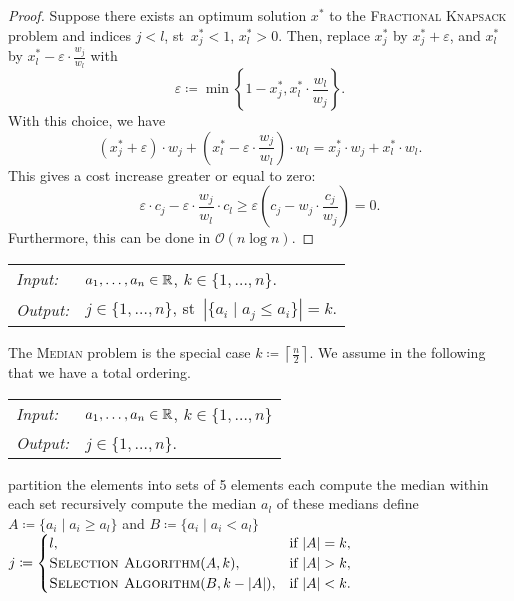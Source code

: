 \documentclass[../skript.tex]{subfiles}
\begin{document}
\begin{proof}
Suppose there exists an optimum solution $x^*$ to the \textsc{Fractional Knapsack} problem and indices $j < l$, \ac{st}\ $x_j^* < 1$, $x_l^* > 0$.
Then, replace $x_j^*$ by $x_j^* + \varepsilon$, and $x_l^*$ by $x_l^* - \varepsilon \cdot \frac{w_j}{w_l}$ with
\[
	\varepsilon \coloneqq \min \left\{ 1-x_j^*, x_l^* \cdot \frac{w_l}{w_j} \right\}.
\]
With this choice, we have
\[
	(x_j^* + \varepsilon) \cdot w_j + \left(x_l^* - \varepsilon \cdot \frac{w_j}{w_l}\right) \cdot w_l = x_j^* \cdot w_j + x_l^* \cdot w_l.
\]
This gives a cost increase greater or equal to zero:
\[
	\varepsilon \cdot c_j - \varepsilon \cdot \frac{w_j}{w_l} \cdot c_l \geq \varepsilon \left( c_j - w_j \cdot \frac{c_j}{w_j} \right) = 0.
\]
Furthermore, this can be done in $\mathcal{O}(n \log n)$.
\end{proof}
\begin{problem}[Selection]
\begin{tabular}{@{}ll}
\textit{Input:} & $a_1, \ldots, a_n \in \mathbb{R}$, $k \in \{ 1, \ldots, n \}$. \\
\textit{Output:} & $j \in \{ 1, \ldots, n \}$, \ac{st}\ $|\{ a_i \mid a_j \leq a_i \}| = k$.
\end{tabular}
\end{problem}
The \textsc{Median} problem is the special case $k \coloneqq \left\lceil \frac{n}{2} \right\rceil$.
We assume in the following that we have a total ordering.
\pagebreak
\begin{algorithmbox}
\begin{tabular}{@{}ll}
\textit{Input:} & $a_1, \ldots, a_n \in \mathbb{R}$, $k \in \{ 1, \ldots, n \}$ \\
\textit{Output:} & $j \in \{ 1, \ldots, n \}$.
\end{tabular}
\end{algorithmbox}
\vspace{-7pt}
\begin{algorithm}[H]
partition the elements into sets of 5 elements each\;
compute the median within each set\;
recursively compute the median $a_l$ of these medians\;
define $A \coloneqq \{ a_i \mid a_i \geq a_l \}$ and $B \coloneqq \{ a_i \mid a_i < a_l \}$\;
$j \coloneqq \begin{cases}
l, & \text{if } |A| = k, \\
\textsc{Selection Algorithm}(A, k), & \text{if } |A| > k, \\
\textsc{Selection Algorithm}(B, k - |A|), & \text{if } |A| < k.
\end{cases}$\;
\end{algorithm}
\end{document}
